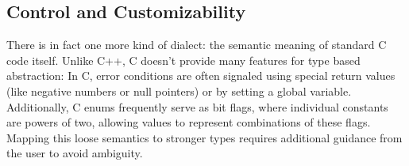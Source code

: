 \subsection{Control and Customizability}
There is in fact one more kind of dialect: the semantic meaning of standard C code itself. Unlike C++, C doesn't provide many features for type based abstraction: In C, error conditions are often signaled using special return values (like negative numbers or null pointers) or by setting a global variable. Additionally, C enums frequently serve as bit flags, where individual constants are powers of two, allowing values to represent combinations of these flags. Mapping this loose semantics to stronger types requires additional guidance from the user to avoid ambiguity.




